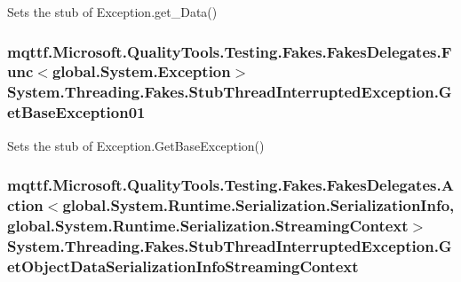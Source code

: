 Sets the stub of Exception.\-get\-\_\-\-Data()

\hypertarget{class_system_1_1_threading_1_1_fakes_1_1_stub_thread_interrupted_exception_a71996206cee25064a13f4082c32a0e88}{
\subsubsection[{Get\-Base\-Exception01}]{\setlength{\rightskip}{0pt plus 5cm}mqttf.\-Microsoft.\-Quality\-Tools.\-Testing.\-Fakes.\-Fakes\-Delegates.\-Func$<$global.\-System.\-Exception$>$ System.\-Threading.\-Fakes.\-Stub\-Thread\-Interrupted\-Exception.\-Get\-Base\-Exception01}}\label{class_system_1_1_threading_1_1_fakes_1_1_stub_thread_interrupted_exception_a71996206cee25064a13f4082c32a0e88}


Sets the stub of Exception.\-Get\-Base\-Exception()

\hypertarget{class_system_1_1_threading_1_1_fakes_1_1_stub_thread_interrupted_exception_a662a5c5af732fe7420f106dbb9974c18}{
\subsubsection[{Get\-Object\-Data\-Serialization\-Info\-Streaming\-Context}]{\setlength{\rightskip}{0pt plus 5cm}mqttf.\-Microsoft.\-Quality\-Tools.\-Testing.\-Fakes.\-Fakes\-Delegates.\-Action$<$global.\-System.\-Runtime.\-Serialization.\-Serialization\-Info, global.\-System.\-Runtime.\-Serialization.\-Streaming\-Context$>$ System.\-Threading.\-Fakes.\-Stub\-Thread\-Interrupted\-Exception.\-Get\-Object\-Data\-Serialization\-Info\-Streaming\-Context}}\label{class_system_1_1_threading_1_1_fakes_1_1_stub_thread_interrupted_exception_a662a5c5af732fe7420f106dbb9974c18}


